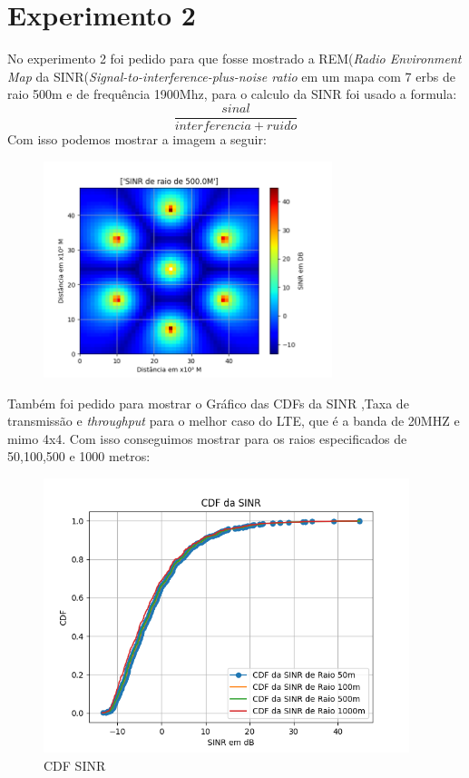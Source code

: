 \documentclass[12pt]{article}
\begin{document}
\section{Experimento 2}
No experimento 2 foi pedido para que fosse mostrado a REM(\textit{Radio Environment Map} da SINR(\textit{Signal-to-interference-plus-noise ratio} em um mapa com 7 erbs de raio 500m e de frequência 1900Mhz, para o calculo da SINR foi usado a formula:\cite{SINR}
\begin{equation}
    \frac{sinal}{interferencia + ruido}
\end{equation}
Com isso podemos mostrar a imagem a seguir:
\begin{figure}[h!]
\includegraphics[width=0.75\textwidth]{REMSINR.png}
    \caption{}
    \label{fig:my_label}
\end{figure}
\FloatBarrier
Também foi pedido para mostrar o Gráfico das CDFs da SINR ,Taxa de transmissão e \textit{throughput} para o melhor caso do LTE, que é a banda de 20MHZ e mimo 4x4. Com isso conseguimos mostrar para os raios especificados de 50,100,500 e 1000 metros:
\begin{figure}[h!]
\includegraphics[width=0.95\textwidth]{CDF_SINR.png}
    \caption{CDF SINR}
    \label{fig:my_label}
\end{figure}
\end{document}
